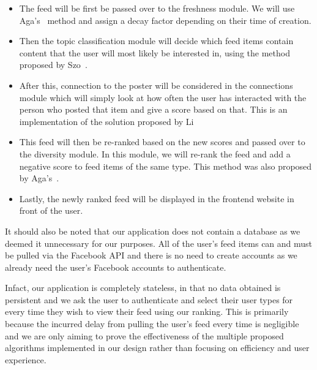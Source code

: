 \begin{itemize}
\item The feed will be first be passed over to the freshness module. We will use Aga's~\cite{Aga2014} method and assign a decay factor depending on their time of creation. 
\item Then the topic classification module will decide which feed items contain content that the user will most likely be interested in, using the method proposed by Szo~\cite{szomszor2008semantic}.
\item After this, connection to the poster will be considered in the connections module which will simply look at how often the user has interacted with the person who posted that item and give a score based on that. This is an implementation of the solution proposed by Li~\cite{LiTiaLee2010}
\item This feed will then be re-ranked based on the new scores and passed over to the diversity module. In this module, we will re-rank the feed and add a negative score to feed items of the same type. This method was also proposed by Aga's~\cite{Aga2014}.
\item Lastly, the newly ranked feed will be displayed in the frontend website in front of the user.
\end{itemize}

It should also be noted that our application does not contain a database as we deemed it unnecessary for our purposes. All of the user’s feed items can and must be pulled via the Facebook API and there is no need to create accounts as we already need the user’s Facebook accounts to authenticate. 

Infact, our application is completely stateless, in that no data obtained is persistent and we ask the user to authenticate and select their user types for every time they wish to view their feed using our ranking. This is primarily because the incurred delay from pulling the user’s feed every time is negligible and we are only aiming to prove the effectiveness of the multiple proposed algorithms implemented in our design rather than focusing on efficiency and user experience.